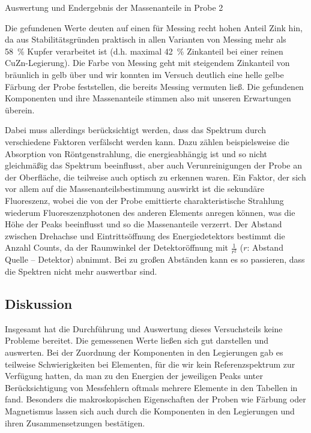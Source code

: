 \documentclass[11pt, a4paper]{article}
\begin{document}
\begin{table}[h]
\centering

\caption{Auswertung und Endergebnis der Massenanteile in Probe 2}
\label{tab:massenanteile}
\end{table}

Die gefundenen Werte deuten auf einen für Messing recht hohen Anteil Zink hin, da aus Stabilitätsgründen praktisch in allen Varianten von Messing mehr als \SI{58}{\percent} Kupfer verarbeitet ist (d.h. maximal \SI{42}{\percent} Zinkanteil bei einer reinen CuZn-Legierung).
Die Farbe von Messing geht mit steigendem Zinkanteil von bräunlich in gelb über und wir konnten im Versuch deutlich eine helle gelbe Färbung der Probe feststellen, die bereits Messing vermuten ließ.
Die gefundenen Komponenten und ihre Massenanteile stimmen also mit unseren Erwartungen überein.

Dabei muss allerdings berücksichtigt werden, dass das Spektrum durch verschiedene Faktoren verfälscht werden kann.
Dazu zählen beispielsweise die Absorption von Röntgenstrahlung, die energieabhängig ist und so nicht gleichmäßig das Spektrum beeinflusst, aber auch Verunreinigungen der Probe an der Oberfläche, die teilweise auch optisch zu erkennen waren.
Ein Faktor, der sich vor allem auf die Massenanteilsbestimmung auswirkt ist die sekundäre Fluoreszenz, wobei die von der Probe emittierte charakteristische Strahlung wiederum Fluoreszenzphotonen des anderen Elements anregen können, was die Höhe der Peaks beeinflusst und so die Massenanteile verzerrt.
Der Abstand zwischen Drehachse und Eintrittsöffnung des Energiedetektors bestimmt die Anzahl Counts, da der Raumwinkel der Detektoröffnung mit $\frac{1}{r^2}$ ($r$: Abstand Quelle -- Detektor) abnimmt.
Bei zu großen Abständen kann es so passieren, dass die Spektren nicht mehr auswertbar sind. 

\subsection{Diskussion}

Insgesamt hat die Durchführung und Auswertung dieses Versuchsteils keine Probleme bereitet.
Die gemessenen Werte ließen sich gut darstellen und auswerten.
Bei der Zuordnung der Komponenten in den Legierungen gab es teilweise Schwierigkeiten bei Elementen, für die wir kein Referenzspektrum zur Verfügung hatten, da man zu den Energien der jeweiligen Peaks unter Berücksichtigung von Messfehlern oftmals mehrere Elemente in den Tabellen in \cite{booklet} fand.
Besonders die makroskopischen Eigenschaften der Proben wie Färbung oder Magnetismus lassen sich auch durch die Komponenten in den Legierungen und ihren Zusammensetzungen bestätigen.
\end{document}
